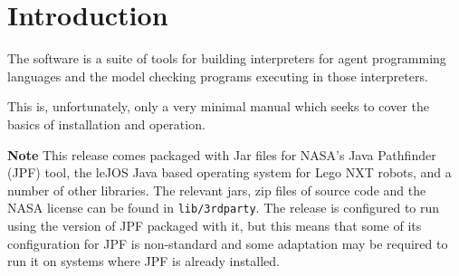 \chapter{Introduction}

The \mcapl{} software is a suite of tools for building interpreters
for agent programming languages and the model checking programs
executing in those interpreters.  

This is, unfortunately, only a very minimal manual which seeks to cover the basics of installation and operation.

{\bf Note} This release comes packaged with Jar files for NASA's Java Pathfinder (JPF) tool, the leJOS Java based operating system for Lego NXT robots, and a number of other libraries.  The relevant jars, zip files of source code and the NASA license can be found in \texttt{lib/3rdparty}.  The release is configured to run using the version of JPF packaged with it, but this means that some of its configuration for JPF is non-standard and some adaptation may be required to run it on systems where JPF is already installed.

